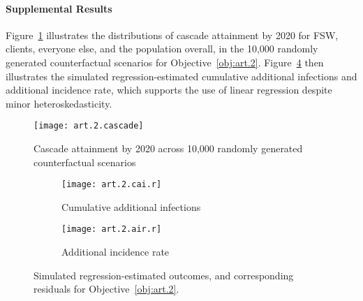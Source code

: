 \paragraph{Supplemental Results}
Figure~\ref{fig:art.2.cascade} illustrates the distributions of cascade attainment by 2020
for FSW, clients, everyone else, and the population overall,
in the 10,000 randomly generated counterfactual scenarios
for Objective~\ref{obj:art.2}.
Figure~\ref{fig:art.2.r} then illustrates the simulated \vs regression-estimated
cumulative additional infections and additional incidence rate,
which supports the use of linear regression
despite minor heteroskedasticity.
\begin{figure}[h]
  \centering
  \texttt{[image: art.2.cascade]}
  \caption{Cascade attainment by 2020 across 10,000 randomly generated counterfactual scenarios}
  \label{fig:art.2.cascade}
\end{figure}
\begin{figure}[h]
  \begin{subfigure}{.5\linewidth}
    \texttt{[image: art.2.cai.r]}
    \caption{Cumulative additional infections}
    \label{fig:art.2.cai.r}
  \end{subfigure}%
  \begin{subfigure}{.5\linewidth}
    \texttt{[image: art.2.air.r]}
    \caption{Additional incidence rate}
    \label{fig:art.2.air.r}
  \end{subfigure}
  \caption{Simulated \vs regression-estimated outcomes,
    and corresponding residuals for Objective~\ref{obj:art.2}.}
  \label{fig:art.2.r}
\end{figure}
